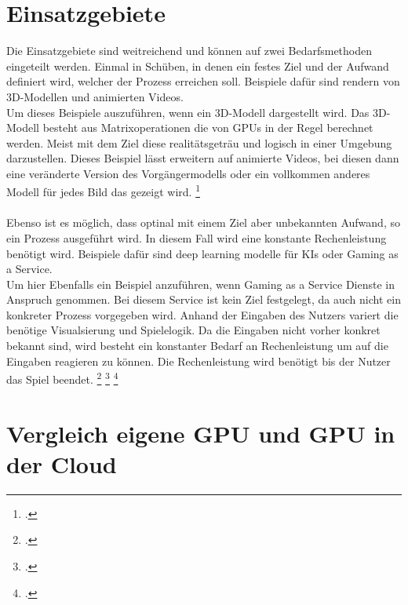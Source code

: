 \documentclass[12pt,toc=bib,toc=listof]{scrreprt}
\begin{document}
\section{Einsatzgebiete}
\label{sec: Einsatzgebiete}


Die Einsatzgebiete sind weitreichend und können auf zwei Bedarfsmethoden eingeteilt werden.
Einmal in Schüben, in denen ein festes Ziel und der Aufwand definiert wird, welcher der Prozess erreichen soll.
Beispiele dafür sind rendern von 3D-Modellen und animierten Videos.
\\ 
Um dieses Beispiele auszuführen, wenn ein 3D-Modell dargestellt wird. Das 3D-Modell besteht aus Matrixoperationen die von GPUs 
in der Regel berechnet werden. Meist mit dem Ziel diese realitätsgeträu und logisch in einer Umgebung darzustellen.
Dieses Beispiel lässt erweitern auf animierte Videos, bei diesen dann eine veränderte Version des Vorgängermodells oder ein 
vollkommen anderes Modell für jedes Bild das gezeigt wird. \footcite [Vgl.] [] {Loop.2006}
\\ \\
Ebenso ist es möglich, dass optinal mit einem Ziel aber unbekannten Aufwand, so ein Prozess ausgeführt wird. 
In diesem Fall wird eine konstante Rechenleistung benötigt wird.
Beispiele dafür sind deep learning modelle für KIs oder Gaming as a Service.
\\
Um hier Ebenfalls ein Beispiel anzuführen, wenn Gaming as a Service Dienste in Anspruch genommen.
Bei diesem Service ist kein Ziel festgelegt, da auch nicht ein konkreter Prozess vorgegeben wird.
Anhand der Eingaben des Nutzers variert die benötige Visualsierung und Spielelogik. Da die Eingaben 
nicht vorher konkret bekannt sind, wird besteht ein konstanter Bedarf an Rechenleistung um auf die Eingaben 
reagieren zu können. Die Rechenleistung wird benötigt bis der Nutzer das Spiel beendet. \footcite [Vgl.] [] {Lattuada.2022} \footcite [Vgl.] [] {Wang.2017} \footcite [Vgl.] [] {Loop.2006}

\section{Vergleich eigene GPU und GPU in der Cloud}
\label{sec:Vergleich eigene GPU und GPU in der Cloud}
\end{document}
